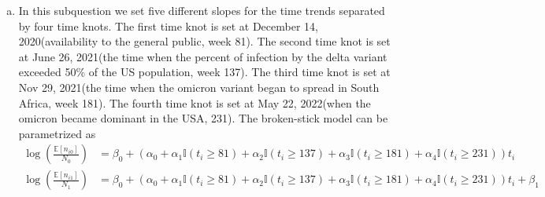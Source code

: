 \documentclass[12pt]{article}
\begin{document}
\begin{enumerate}[(a)]
	\item In this subquestion we set five different slopes for the time trends separated by four time knots. The first time knot is set at December 14, 2020(availability to the general public, week 81). The second time knot is set at June 26, 2021(the time when the percent of infection by the delta variant exceeded 50\% of the US population, week 137). The third time knot is set at Nov 29, 2021(the time when the omicron variant began to spread in South Africa, week 181). The fourth time knot is set at May 22, 2022(when the omicron became dominant in the USA, 231). The broken-stick model can be parametrized as
	 \begin{align*}
		\log(\frac{\mathbb{E}[n_{i0}]}{N_{0}}) &= \beta_{0} + \left(\alpha_{0} + \alpha_{1}\mathbb{I}(t_{i} \geq 81) + \alpha_{2}\mathbb{I}(t_{i} \geq 137) +\alpha_{3} \mathbb{I}(t_{i} \geq 181) + \alpha_{4}\mathbb{I}(t_{i} \geq 231)\right) t_{i}\\
		\log(\frac{\mathbb{E}[n_{i1}]}{N_{1}}) &= \beta_{0} + \left(\alpha_{0} + \alpha_{1}\mathbb{I}(t_{i} \geq 81) + \alpha_{2}\mathbb{I}(t_{i} \geq 137) +\alpha_{3} \mathbb{I}(t_{i} \geq 181) + \alpha_{4}\mathbb{I}(t_{i} \geq 231)\right) t_{i} + \beta_{1}
	\end{align*}
	
\end{enumerate}
\end{document}
